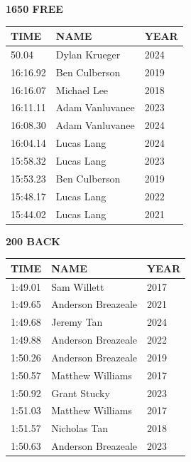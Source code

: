 \begin{table}[H]
\centering
\begin{minipage}[t]{0.48\textwidth}
\centering
\textbf{1650 FREE}\\[0.1cm]
\begin{tabular}{@{}p{1.8cm}p{2.8cm}p{1.2cm}@{}}
\hline
    \textbf{TIME} & \textbf{NAME} & \textbf{YEAR} \\
\hline
    50.04 & Dylan Krueger & 2024 \\
    16:16.92 & Ben Culberson & 2019 \\
    16:16.07 & Michael Lee & 2018 \\
    16:11.11 & Adam Vanluvanee & 2023 \\
    16:08.30 & Adam Vanluvanee & 2024 \\
    16:04.14 & Lucas Lang & 2024 \\
    15:58.32 & Lucas Lang & 2023 \\
    15:53.23 & Ben Culberson & 2019 \\
    15:48.17 & Lucas Lang & 2022 \\
    15:44.02 & Lucas Lang & 2021 \\
\hline
\end{tabular}
\end{minipage}\hfill
\begin{minipage}[t]{0.48\textwidth}
\centering
\textbf{200 BACK}\\[0.1cm]
\begin{tabular}{@{}p{1.8cm}p{2.8cm}p{1.2cm}@{}}
\hline
    \textbf{TIME} & \textbf{NAME} & \textbf{YEAR} \\
\hline
    1:49.01 & Sam Willett & 2017 \\
    1:49.65 & Anderson Breazeale & 2021 \\
    1:49.68 & Jeremy Tan & 2024 \\
    1:49.88 & Anderson Breazeale & 2022 \\
    1:50.26 & Anderson Breazeale & 2019 \\
    1:50.57 & Matthew Williams & 2017 \\
    1:50.92 & Grant Stucky & 2023 \\
    1:51.03 & Matthew Williams & 2017 \\
    1:51.57 & Nicholas Tan & 2018 \\
    1:50.63 & Anderson Breazeale & 2023 \\
\hline
\end{tabular}
\end{minipage}
\end{table}

